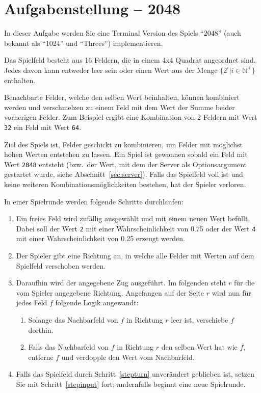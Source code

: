 




\section*{Aufgabenstellung -- 2048}

In dieser Aufgabe werden Sie eine Terminal Version des Spiels "`2048"' (auch
bekannt als "`1024"' und "`Threes"') implementieren.

Das Spielfeld besteht aus 16 Feldern, die in einem 4x4 Quadrat angeordnet sind.
Jedes davon kann entweder leer sein oder einen Wert
aus der Menge $\{ 2^i | i \in \mathbb{N}^+\}$ enthalten.

Benachbarte Felder, welche den selben Wert beinhalten, können kombiniert werden
und verschmelzen zu einem Feld mit dem Wert der Summe beider vorherigen Felder.
Zum Beispiel ergibt eine Kombination von 2 Feldern mit Wert \verb|32| ein Feld
mit Wert \verb|64|.

Ziel des Spiels ist, Felder geschickt zu kombinieren, um Felder mit möglichst
hohen Werten entstehen zu lassen.  Ein Spiel ist gewonnen sobald ein Feld mit
Wert \verb|2048| entsteht (bzw.\ der Wert, mit dem der Server als
Optionsargument gestartet wurde, siehe Abschnitt~\ref{sec:server}).  Falls das
Spielfeld voll ist und keine weiteren Kombinationsmöglichkeiten bestehen, hat
der Spieler verloren.

In einer Spielrunde werden folgende Schritte durchlaufen:

\begin{enumerate}
\item Ein freies Feld wird zufällig ausgewählt und mit einem neuen Wert
      befüllt.
      Dabei soll der Wert \verb|2| mit einer Wahrscheinlichkeit von 0.75 oder
      der Wert \verb|4| mit einer Wahrscheinlichkeit von 0.25 erzeugt werden.
\item Der Spieler gibt eine Richtung an, in welche alle Felder mit Werten
      auf dem Spielfeld verschoben werden.
      \label{stepinput}
\item Daraufhin wird der angegebene Zug ausgeführt. Im folgenden steht $r$ für
      die vom Spieler angegebene Richtung. Angefangen auf der Seite $r$
      wird nun für jedes Feld $f$ folgende Logik angewandt: \label{stepturn}
      \begin{enumerate}
      \item Solange das Nachbarfeld von $f$ in Richtung $r$ leer ist,
            verschiebe $f$ dorthin.
      \item Falls das Nachbarfeld von $f$ in Richtung $r$ den selben Wert hat
            wie $f$, entferne $f$ und verdopple den Wert vom Nachbarfeld.
      \end{enumerate}
\item Falls das Spielfeld durch Schritt~\ref{stepturn} unverändert geblieben
      ist, setzen Sie mit Schritt~\ref{stepinput} fort; andernfalls beginnt
      eine neue Spielrunde.
\end{enumerate}

